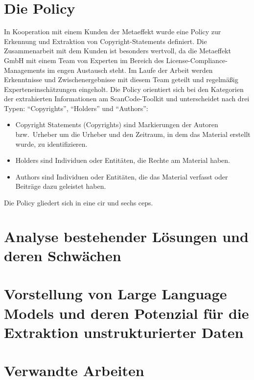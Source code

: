 \section{Die Policy}\label{sec:policy}

In Kooperation mit einem Kunden der Metaeffekt wurde eine Policy zur Erkennung und Extraktion von Copyright-Statements definiert.
Die Zusammenarbeit mit dem Kunden ist besonders wertvoll, da die Metaeffekt GmbH mit einem Team von Experten im Bereich des License-Compliance-Managements im engen Austausch steht.
Im Laufe der Arbeit werden Erkenntnisse und Zwischenergebnisse mit diesem Team geteilt und regelmäßig Experteneinschätzungen eingeholt.
Die Policy orientiert sich bei den Kategorien der extrahierten Informationen am ScanCode-Toolkit und unterscheidet nach drei Typen: \enquote{Copyrights}, \enquote{Holders} und \enquote{Authors}:

\begin{itemize}
    \item Copyright Statements (Copyrights) sind Markierungen der Autoren bzw.\ Urheber um die Urheber und den Zeitraum, in dem das Material erstellt wurde, zu identifizieren.
    \item Holders sind Individuen oder Entitäten, die Rechte am Material haben.
    \item Authors sind Individuen oder Entitäten, die das Material verfasst oder Beiträge dazu geleistet haben.
\end{itemize}

Die Policy gliedert sich in eine \gls{cir} und sechs \glspl{cep}.




\section{Analyse bestehender Lösungen und deren Schwächen}\label{sec:analyse-bestehender-losungen}

\section{Vorstellung von Large Language Models und deren Potenzial für die Extraktion unstrukturierter Daten}\label{sec:vorstellung-llm}


\section{Verwandte Arbeiten}\label{sec:verwandte-arbeiten}

